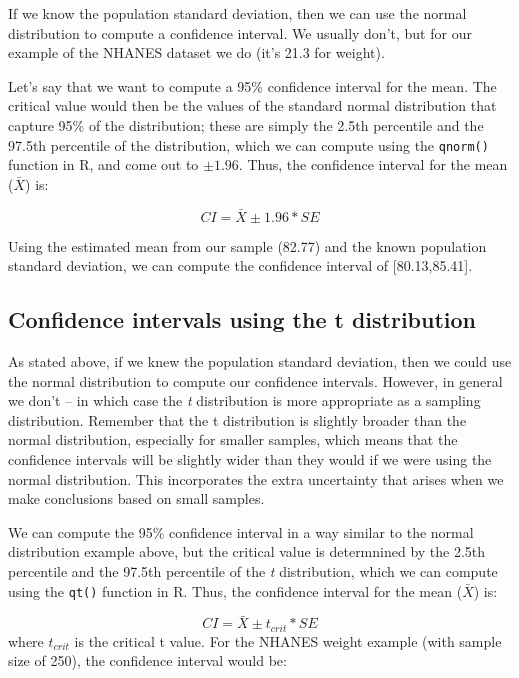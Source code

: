 \documentclass[]{book}
\theoremstyle{definition}
\theoremstyle{definition}
\theoremstyle{definition}
\theoremstyle{remark}
\begin{document}
If we know the population standard deviation, then we can use the normal
distribution to compute a confidence interval. We usually don't, but for
our example of the NHANES dataset we do (it's 21.3 for weight).

Let's say that we want to compute a 95\% confidence interval for the
mean. The critical value would then be the values of the standard normal
distribution that capture 95\% of the distribution; these are simply the
2.5th percentile and the 97.5th percentile of the distribution, which we
can compute using the \texttt{qnorm()} function in R, and come out to
\(\pm 1.96\). Thus, the confidence interval for the mean (\(\bar{X}\))
is:

\[
CI = \bar{X} \pm 1.96*SE
\]

Using the estimated mean from our sample (82.77) and the known
population standard deviation, we can compute the confidence interval of
{[}80.13,85.41{]}.

\subsection{Confidence intervals using the t
distribution}\label{confidence-intervals-using-the-t-distribution}

As stated above, if we knew the population standard deviation, then we
could use the normal distribution to compute our confidence intervals.
However, in general we don't -- in which case the \emph{t} distribution
is more appropriate as a sampling distribution. Remember that the t
distribution is slightly broader than the normal distribution,
especially for smaller samples, which means that the confidence
intervals will be slightly wider than they would if we were using the
normal distribution. This incorporates the extra uncertainty that arises
when we make conclusions based on small samples.

We can compute the 95\% confidence interval in a way similar to the
normal distribution example above, but the critical value is determnined
by the 2.5th percentile and the 97.5th percentile of the \emph{t}
distribution, which we can compute using the \texttt{qt()} function in
R. Thus, the confidence interval for the mean (\(\bar{X}\)) is:

\[
CI = \bar{X} \pm t_{crit}*SE
\] where \(t_{crit}\) is the critical t value. For the NHANES weight
example (with sample size of 250), the confidence interval would be:
\end{document}
